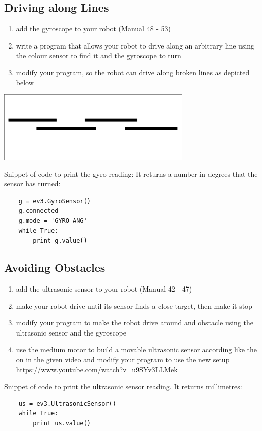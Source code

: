 \documentclass{article}
\begin{document}
  \subsection{Driving along Lines}
  \begin{enumerate}
    \item add the gyroscope to your robot (Manual 48 - 53)
    \item write a program that allows your robot to drive along an arbitrary line using 
        the colour sensor to find it and the gyroscope to turn
    \item modify your program, so the robot can drive along broken lines as depicted below
  \end{enumerate}

  \begin{center}
      \includegraphics[width=0.7\textwidth]{broken_line}
  \end{center}
  
  Snippet of code to print the gyro reading: It returns a number in degrees that
  the sensor has turned: \\
  \begin{verbatim}
    g = ev3.GyroSensor()
    g.connected
    g.mode = 'GYRO-ANG'
    while True:
        print g.value()
  \end{verbatim}
  
  \subsection{Avoiding Obstacles}
  \begin{enumerate}
    \item add the ultrasonic sensor to your robot (Manual 42 - 47)
    \item make your robot drive until its sensor finds a close target, then make it stop
    \item modify your program to make the robot drive around and obstacle using the ultrasonic
        sensor and the gyroscope
    \item use the medium motor to build a movable ultrasonic sensor according like the on
        in the given video and modify your program to use the new setup \\
        \url{https://www.youtube.com/watch?v=u9SYv3LLMek}
  \end{enumerate}

  Snippet of code to print the ultrasonic sensor reading. It returns millimetres:
  \begin{verbatim}
    us = ev3.UltrasonicSensor()
    while True:
        print us.value()
  \end{verbatim}
\end{document}
